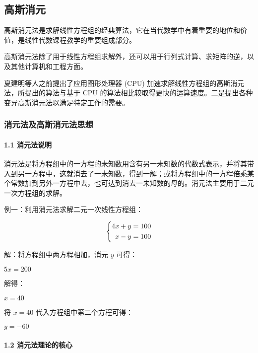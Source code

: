 
\subsection{高斯消元}

\begin{QUOTE}{}{}
高斯消元法是求解线性方程组的经典算法，它在当代数学中有着重要的地位和价值，是线性代数课程教学的重要组成部分。



高斯消元法除了用于线性方程组求解外，还可以用于行列式计算、求矩阵的逆，以及其他计算机和工程方面。



夏建明等人之前提出了应用图形处理器 (CPU) 加速求解线性方程组的高斯消元法，所提出的算法与基于 CPU 的算法相比较取得更快的运算速度。二是提出各种变异高斯消元法以满足特定工作的需要。
\end{QUOTE}

\hr

\subsubsection{消元法及高斯消元法思想}

\paragraph{1.1 消元法说明}

消元法是将方程组中的一方程的未知数用含有另一未知数的代数式表示，并将其带入到另一方程中，这就消去了一未知数，得到一解；或将方程组中的一方程倍乘某个常数加到另外一方程中去，也可达到消去一未知数的母的。消元法主要用于二元一次方程组的求解。

例一：利用消元法求解二元一次线性方程组：

$$
\left\{\begin{aligned}
4x+y&=100 \notag \\
x-y&=100 \notag
\end{aligned}\right.
$$

解：将方程组中两方程相加，消元 $y$ 可得：

$5x = 200$

解得：

$x = 40$

将 $x = 40$ 代入方程组中第二个方程可得：

$y = -60$

\paragraph{1.2  消元法理论的核心}

